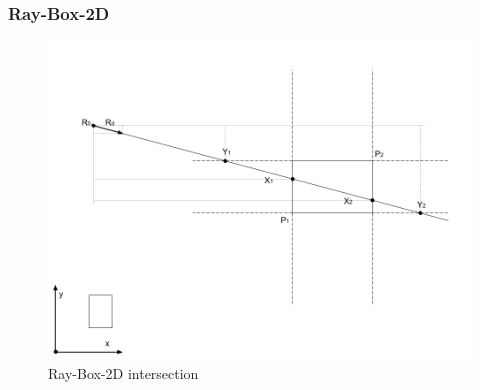 \subsubsection{Ray-Box-2D}

\begin{figure}[H]
\caption{Ray-Box-2D intersection}
\label{fig:ray-box-2d}
\centering
\includegraphics[width=\linewidth]{Figures/ray-box-2d-intersection.png}
\decoRule
\end{figure}

